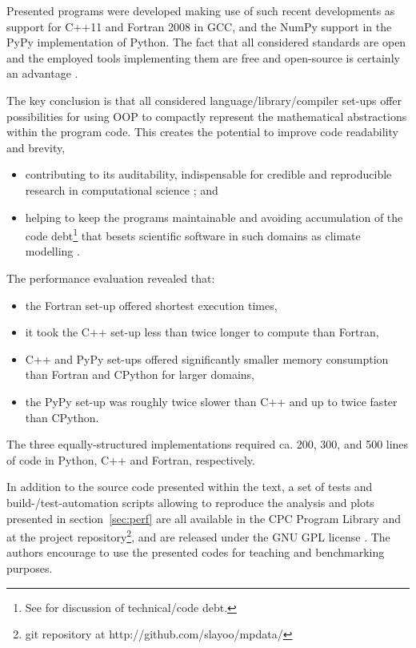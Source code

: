 \documentclass[review,peprint,10pt,5p,times]{elsarticle}
\newcommand{\url}[1]{{#1}}
\begin{document}
  Presented programs were developed making use of such recent
    developments as support for C++11 and Fortran 2008 in GCC, and
    the NumPy support in the PyPy implementation of Python.
  The fact that all considered standards are open and the employed
    tools implementing them are free and open-source
    is certainly an advantage \citep{Anel_2011}.

  The key conclusion is that all considered language/library/compiler
    set-ups offer possibilities for using OOP to compactly 
    represent the mathematical abstractions within the program code. 
  This creates the potential to improve code readability and brevity,
  \begin{itemize}
    \item{contributing to its 
      auditability, indispensable for credible and reproducible research in computational science 
      \citep{Post_et_al_2005, Merali_et_al_2010, Stodden_et_al_2012}; and
    }
    \item{helping to keep the programs maintainable and avoiding accumulation of the code 
      debt\footnote{See \citet{Buschmann_2011} for discussion of technical/code debt.} 
      that besets scientific software in such domains as climate modelling
      \citep{Freeman_et_al_2010}.
    }
  \end{itemize}
  \noindent 
  The performance evaluation revealed that:
    \begin{itemize}
      \item{the Fortran set-up offered shortest execution times,}
      \item{it took the C++ set-up less than twice longer to compute than Fortran,}
      \item{C++ and PyPy set-ups offered significantly smaller memory consumption 
        than Fortran and CPython for larger domains,}
      \item{the PyPy set-up was roughly twice slower than C++ and up to twice faster than CPython.}
    \end{itemize}
  The three equally-structured implementations required ca. 200, 300, and 500 lines of code 
    in Python, C++ and Fortran, respectively.  

  In addition to the source code presented within the text,
    a set of tests and build-/test-automation scripts
    allowing to reproduce the analysis and plots presented in section~\ref{sec:perf} are all 
    available in the CPC Program Library and at
    the project repository\footnote{git repository at \url{http://github.com/slayoo/mpdata/}},
    and are released under the GNU GPL license \citep{GPLv3}.
  The authors encourage to use the presented codes for teaching and benchmarking purposes.
\end{document}
